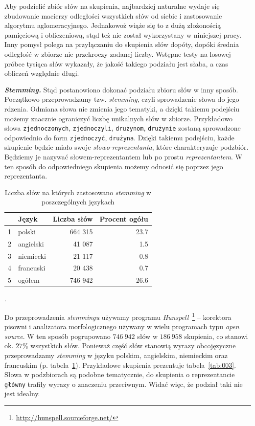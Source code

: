 \documentclass{praca1}
\begin{document}
Aby podzielić zbiór słów na skupienia, najbardziej naturalne wydaje się zbudowanie macierzy odległości wszystkich słów od siebie i zastosowanie algorytmu aglomeracyjnego. Jednakowoż wiąże się to z dużą złożonością pamięciową i obliczeniową, stąd też nie został wykorzystany w niniejszej pracy. Inny pomysł polega na przyłączaniu do skupienia słów dopóty, dopóki średnia odległość w zbiorze nie przekroczy zadanej liczby. Wstępne testy na losowej próbce tysiąca słów wykazały, że jakość takiego podziału jest słaba, a czas obliczeń względnie długi.

\emph{\textbf{Stemming.}}
Stąd postanowiono dokonać podziału zbioru słów w inny sposób. Początkowo przeprowadzamy tzw. \emph{stemming}, czyli sprowadzenie słowa do jego rdzenia. Odmiana słowa nie zmienia jego tematyki, a dzięki takiemu podejściu możemy znacznie ograniczyć liczbę unikalnych słów w zbiorze. Przykładowo słowa \verb|zjednoczonych|, \verb|zjednoczyli|, \verb|drużynom|, \verb|drużynie| zostaną sprowadzone odpowiednio do form \verb|zjednoczyć|, \verb|drużyna|. Dzięki takiemu podejściu, każde skupienie będzie miało swoje \emph{słowo-reprezentanta}, które charakteryzuje podzbiór. Będziemy je nazywać słowem-reprezentantem lub po prostu \emph{reprezentantem}. W ten sposób do odpowiedniego skupienia możemy odnosić się poprzez jego reprezentanta.

\begin{table}[!h]
\centering
\begin{tabular}{|rl|rr|}
  \hline
 & Język & Liczba słów & Procent ogółu\\ 
  \hline
1 & polski & 664 315 & 23.7 \\ 
  2 & angielski & 41 087 & 1.5 \\ 
  3 & niemiecki & 21 117 & 0.8 \\ 
  4 & francuski & 20 438 & 0.7 \\ \hline
  5 & ogółem & 746 942 & 26.6 \\ 
   \hline
\end{tabular}
\caption{Liczba słów na których zastosowano \emph{stemming} w poszczególnych językach}.
\label{tab:002}
\end{table}

Do przeprowadzenia \emph{stemmingu} używamy programu \emph{Hunspell}~\footnote{\url{http://hunspell.sourceforge.net/}} -- korektora pisowni i analizatora morfologicznego używany w wielu programach typu \emph{open source}. W ten sposób pogrupowano $746\ 942$ słów w $186\ 958$ skupienia, co stanowi ok. $27\%$ wszystkich słów. Ponieważ część słów stanowią wyrazy obcojęzyczne przeprowadzamy \emph{stemming} w języku polskim, angielskim, niemieckim oraz francuskim (p. tabela~\ref{tab:002}). Przykładowe skupienia prezentuje tabela~\ref{tab:003}. Słowa w podzbiorach są podobne tematycznie, do skupienia o reprezentancie \verb|główny| trafiły wyrazy o znaczeniu przeciwnym. Widać więc, że podział taki nie jest idealny.
\end{document}
